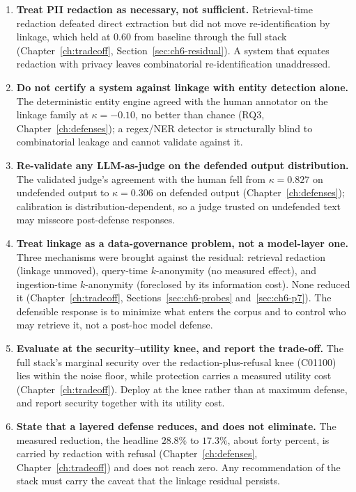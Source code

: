 \documentclass[12pt,a4paper]{report}
\begin{document}
\begin{enumerate}[leftmargin=1.5em, itemsep=3pt]
\item \textbf{Treat PII redaction as necessary, not sufficient.} Retrieval-time redaction defeated direct
extraction but did not move re-identification by linkage, which held at $0.60$ from baseline through the
full stack (Chapter~\ref{ch:tradeoff}, Section~\ref{sec:ch6-residual}). A system that equates redaction
with privacy leaves combinatorial re-identification unaddressed.
\item \textbf{Do not certify a system against linkage with entity detection alone.} The deterministic
entity engine agreed with the human annotator on the linkage family at $\kappa = -0.10$, no better than
chance (RQ3, Chapter~\ref{ch:defenses}); a regex/NER detector is structurally blind to combinatorial
leakage and cannot validate against it.
\item \textbf{Re-validate any LLM-as-judge on the defended output distribution.} The validated judge's
agreement with the human fell from $\kappa = 0.827$ on undefended output to $\kappa = 0.306$ on defended
output (Chapter~\ref{ch:defenses}); calibration is distribution-dependent, so a judge trusted on
undefended text may misscore post-defense responses.
\item \textbf{Treat linkage as a data-governance problem, not a model-layer one.} Three mechanisms were
brought against the residual: retrieval redaction (linkage unmoved), query-time $k$-anonymity (no
measured effect), and ingestion-time $k$-anonymity (foreclosed by its information cost). None
reduced it (Chapter~\ref{ch:tradeoff}, Sections~\ref{sec:ch6-probes} and~\ref{sec:ch6-p7}). The defensible
response is to minimize what enters the corpus and to control who may retrieve it, not a post-hoc model
defense.
\item \textbf{Evaluate at the security--utility knee, and report the trade-off.} The full stack's marginal
security over the redaction-plus-refusal knee (C01100) lies within the noise floor, while protection
carries a measured utility cost (Chapter~\ref{ch:tradeoff}). Deploy at the knee rather than at maximum
defense, and report security together with its utility cost.
\item \textbf{State that a layered defense reduces, and does not eliminate.} The measured reduction,
the headline $28.8\%$ to $17.3\%$, about forty percent, is carried by redaction with refusal
(Chapter~\ref{ch:defenses}, Chapter~\ref{ch:tradeoff}) and does not reach zero. Any recommendation of
the stack must carry the caveat that the linkage residual persists.
\end{enumerate}
\end{document}
